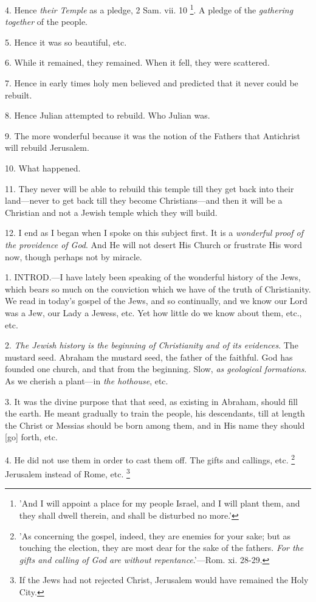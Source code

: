 4. Hence \emph{their Temple} as a pledge, 2 Sam.
vii. 10 \footnote{'And I will appoint a
place for my people Israel, and I will plant them, and they shall
dwell therein, and shall be disturbed no more.'}. A pledge of
the \emph{gathering together} of the people.

5. Hence it was so beautiful, etc.

6. While it remained, they remained. When it
fell, they were scattered.

7. Hence in early times holy men believed and
predicted that it never could be rebuilt.

8. Hence Julian attempted to rebuild. Who Julian
was.

9. The more wonderful because it was the notion
of the Fathers that Antichrist will rebuild Jerusalem.

10. What happened.

11. They never will be able to rebuild this
temple till they get back into their land—never to get back till
they become Christians—and then it will be a Christian and not a
Jewish temple which they will build.

12. I end as I began when I spoke on this subject
first. It is a \emph{wonderful proof of the providence of God}. And He
will not desert His Church or frustrate His word now, though perhaps
not by miracle.


1. INTROD.—I
have lately been speaking of the wonderful history of the Jews, which
bears so much on the conviction which we have of the truth of
Christianity. We read in today's gospel of the Jews, and so
continually, and we know our Lord was a Jew, our Lady a Jewess, etc.
Yet how little do we know about them, etc., etc.

2. \emph{The Jewish history is the beginning of
Christianity and of its evidences}. The mustard seed. Abraham the
mustard seed, the father of the faithful. God has founded one church,
and that from the beginning. Slow, \emph{as geological formations}. As
we cherish a plant—in \emph{the hothouse}, etc.

3. It was the divine purpose that that seed, as
existing in Abraham, should fill the earth. He meant gradually to
train the people, his descendants, till at length the Christ or
Messias should be born among them, and in His name they should [go]
forth, etc.

4. He did not use them in order to cast them off.
The gifts and callings, etc. \footnote{'As concerning the
gospel, indeed, they are enemies for your sake; but as touching the
election, they are most dear for the sake of the fathers. \emph{For the
gifts and calling of God are without repentance}.'—Rom. xi.
28-29.} Jerusalem instead of Rome, etc. \footnote{If the Jews had not
rejected Christ, Jerusalem would have remained the Holy City.}

